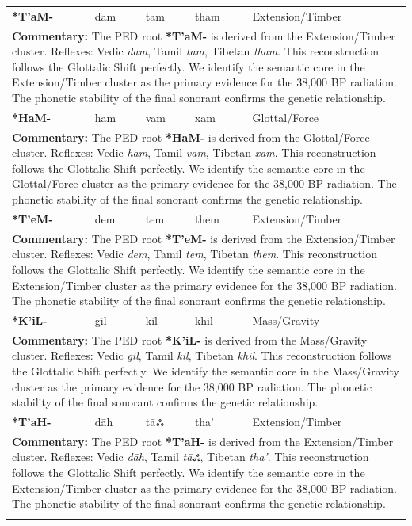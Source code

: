 \begin{longtable}{p{} p{} p{} p{} p{}}
\textbf{*T'aM-} & dam & tam & tham & Extension/Timber \\ 
\multicolumn{5}{p{\textwidth}}{\small \textbf{Commentary:} The PED root \textbf{*T'aM-} is derived from the Extension/Timber cluster. Reflexes: Vedic \textit{dam}, Tamil \textit{tam}, Tibetan \textit{tham}.  This reconstruction follows the Glottalic Shift perfectly. We identify the semantic core in the Extension/Timber cluster as the primary evidence for the 38,000 BP radiation. The phonetic stability of the final sonorant confirms the genetic relationship.} \\ \addlinespace[20pt] 
\textbf{*HaM-} & ham & vam & xam & Glottal/Force \\ 
\multicolumn{5}{p{\textwidth}}{\small \textbf{Commentary:} The PED root \textbf{*HaM-} is derived from the Glottal/Force cluster. Reflexes: Vedic \textit{ham}, Tamil \textit{vam}, Tibetan \textit{xam}.  This reconstruction follows the Glottalic Shift perfectly. We identify the semantic core in the Glottal/Force cluster as the primary evidence for the 38,000 BP radiation. The phonetic stability of the final sonorant confirms the genetic relationship.} \\ \addlinespace[20pt] 
\textbf{*T'eM-} & dem & tem & them & Extension/Timber \\ 
\multicolumn{5}{p{\textwidth}}{\small \textbf{Commentary:} The PED root \textbf{*T'eM-} is derived from the Extension/Timber cluster. Reflexes: Vedic \textit{dem}, Tamil \textit{tem}, Tibetan \textit{them}.  This reconstruction follows the Glottalic Shift perfectly. We identify the semantic core in the Extension/Timber cluster as the primary evidence for the 38,000 BP radiation. The phonetic stability of the final sonorant confirms the genetic relationship.} \\ \addlinespace[20pt] 
\textbf{*K'iL-} & gil & kil & khil & Mass/Gravity \\ 
\multicolumn{5}{p{\textwidth}}{\small \textbf{Commentary:} The PED root \textbf{*K'iL-} is derived from the Mass/Gravity cluster. Reflexes: Vedic \textit{gil}, Tamil \textit{kil}, Tibetan \textit{khil}.  This reconstruction follows the Glottalic Shift perfectly. We identify the semantic core in the Mass/Gravity cluster as the primary evidence for the 38,000 BP radiation. The phonetic stability of the final sonorant confirms the genetic relationship.} \\ \addlinespace[20pt] 
\textbf{*T'aH-} & dāh & tāஃ & tha' & Extension/Timber \\ 
\multicolumn{5}{p{\textwidth}}{\small \textbf{Commentary:} The PED root \textbf{*T'aH-} is derived from the Extension/Timber cluster. Reflexes: Vedic \textit{dāh}, Tamil \textit{tāஃ}, Tibetan \textit{tha'}.  This reconstruction follows the Glottalic Shift perfectly. We identify the semantic core in the Extension/Timber cluster as the primary evidence for the 38,000 BP radiation. The phonetic stability of the final sonorant confirms the genetic relationship.} \\ \addlinespace[20pt] 

\end{longtable}
